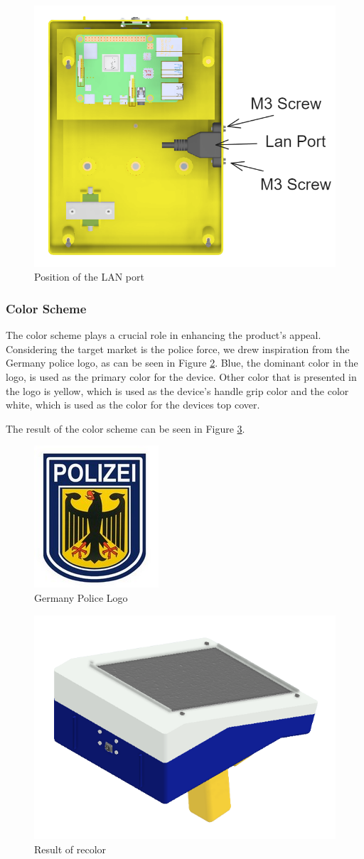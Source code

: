 \begin{figure}[h!]
    \centering
    \includegraphics[height=5 cm]{texs/Part1/chapter4/image/d32.png}
    \caption{Position of the LAN port}
    \label{fig:lan_port_position}
\end{figure}

\subsubsection{Color Scheme}

The color scheme plays a crucial role in enhancing the product's appeal. Considering the target market is the police force, we drew inspiration from the Germany police logo, as can be seen in Figure \ref{fig:polizei_logo}. Blue, the dominant color in the logo, is used as the primary color for the device. Other color that is presented in the logo is yellow, which is used as the device's handle grip color and the color white, which is used as the color for the devices top cover.

The result of the color scheme can be seen in Figure \ref{fig:color_scheme}.

\begin{figure}[h!]
    \centering
    \includegraphics[height=5 cm]{texs/Part1/chapter4/image/polizei.jpg}
    \caption{Germany Police Logo \cite{bundespolizei}}
    \label{fig:polizei_logo}
\end{figure}

\begin{figure}[h!]
    \centering
    \includegraphics[height=9 cm]{texs/Part1/chapter4/image/d41.png}
    \caption{Result of recolor}
    \label{fig:color_scheme}
\end{figure}


